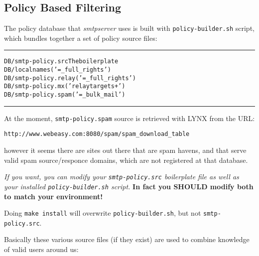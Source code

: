 \subsection{Policy Based Filtering}
\label{adm:smtp_policy_filtering}


The policy database that {\em smtpserver} uses is built with
{\tt policy-builder.sh} script, which bundles together a set
of policy source files:

\begin{alltt}\medskip\hrule\small\medskip
DB/smtp-policy.src   The boilerplate
DB/localnames        ('= _full_rights')
DB/smtp-policy.relay ('= _full_rights')
DB/smtp-policy.mx    ('relaytargets +')
DB/smtp-policy.spam  ('= _bulk_mail')
\medskip\hrule\end{alltt}\medskip


At the moment, {\tt smtp-policy.spam} source is retrieved with LYNX from
the URL:
\begin{alltt}\medskip\scriptsize\medskip
http://www.webeasy.com:8080/spam/spam\_download\_table
\medskip\end{alltt}\medskip
however it seems there are sites out there that are spam havens, and
that serve valid spam source/responce domains, which are not registered
at that database.

{\em If you want, you can modify your {\tt smtp-policy.src} boilerplate
file as well as your installed {\tt\small policy-builder.sh} script.}
{\bf In fact you SHOULD modify both to match your environment!}

Doing {\tt make install} will overwrite {\tt\small policy-builder.sh},
but not {\tt smtp-policy.src}.

Basically these various source files (if they exist) are used to
combine knowledge of valid users around us:

